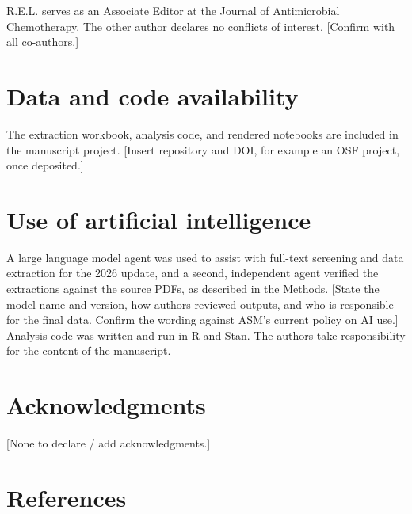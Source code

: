 \documentclass[
  11pt,
]{article}
\begin{document}
R.E.L. serves as an Associate Editor at the Journal of Antimicrobial
Chemotherapy. The other author declares no conflicts of interest.
{[}Confirm with all co-authors.{]}

\section*{Data and code availability}\label{data-and-code-availability}

The extraction workbook, analysis code, and rendered notebooks are
included in the manuscript project. {[}Insert repository and DOI, for
example an OSF project, once deposited.{]}

\section*{Use of artificial
intelligence}\label{use-of-artificial-intelligence}

A large language model agent was used to assist with full-text screening
and data extraction for the 2026 update, and a second, independent agent
verified the extractions against the source PDFs, as described in the
Methods. {[}State the model name and version, how authors reviewed
outputs, and who is responsible for the final data. Confirm the wording
against ASM's current policy on AI use.{]} Analysis code was written and
run in R and Stan. The authors take responsibility for the content of
the manuscript.

\section*{Acknowledgments}\label{acknowledgments}

{[}None to declare / add acknowledgments.{]}

\section*{References}\label{references}
\end{document}
